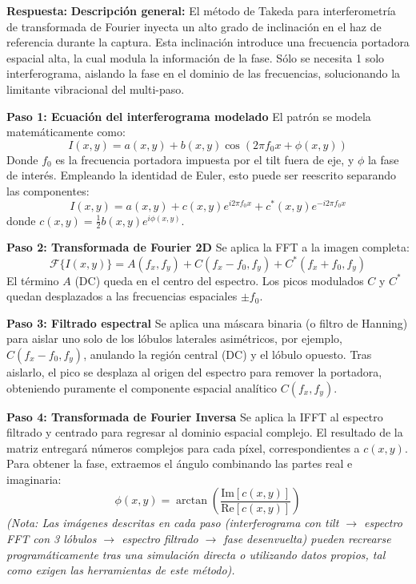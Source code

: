 \documentclass[12pt,letterpaper]{article}
\begin{document}
	\textbf{Respuesta:}
	\textbf{Descripción general:} El método de Takeda para interferometría de transformada de Fourier inyecta un alto grado de inclinación en el haz de referencia durante la captura. Esta inclinación introduce una frecuencia portadora espacial alta, la cual modula la información de la fase. Sólo se necesita 1 solo interferograma, aislando la fase en el dominio de las frecuencias, solucionando la limitante vibracional del multi-paso.
	
	\textbf{Paso 1: Ecuación del interferograma modelado}
	El patrón se modela matemáticamente como:
	\[
	I(x,y) = a(x,y) + b(x,y)\cos(2\pi f_0 x + \phi(x,y))
	\]
	Donde $f_0$ es la frecuencia portadora impuesta por el tilt fuera de eje, y $\phi$ la fase de interés. Empleando la identidad de Euler, esto puede ser reescrito separando las componentes:
	\[
	I(x,y) = a(x,y) + c(x,y)e^{i2\pi f_0 x} + c^*(x,y)e^{-i2\pi f_0 x}
	\]
	donde $c(x,y) = \frac{1}{2}b(x,y)e^{i\phi(x,y)}$.
	
	\textbf{Paso 2: Transformada de Fourier 2D}
	Se aplica la FFT a la imagen completa:
	\[
	\mathcal{F}\{I(x,y)\} = A(f_x, f_y) + C(f_x - f_0, f_y) + C^*(f_x + f_0, f_y)
	\]
	El término $A$ (DC) queda en el centro del espectro. Los picos modulados $C$ y $C^*$ quedan desplazados a las frecuencias espaciales $\pm f_0$.
	
	\textbf{Paso 3: Filtrado espectral}
	Se aplica una máscara binaria (o filtro de Hanning) para aislar uno solo de los lóbulos laterales asimétricos, por ejemplo, $C(f_x - f_0, f_y)$, anulando la región central (DC) y el lóbulo opuesto. Tras aislarlo, el pico se desplaza al origen del espectro para remover la portadora, obteniendo puramente el componente espacial analítico $C(f_x, f_y)$.
	
	\textbf{Paso 4: Transformada de Fourier Inversa}
	Se aplica la IFFT al espectro filtrado y centrado para regresar al dominio espacial complejo. El resultado de la matriz entregará números complejos para cada píxel, correspondientes a $c(x,y)$.
	Para obtener la fase, extraemos el ángulo combinando las partes real e imaginaria:
	\[
	\phi(x,y) = \arctan\left(\frac{\text{Im}[c(x,y)]}{\text{Re}[c(x,y)]}\right)
	\]
	\textit{(Nota: Las imágenes descritas en cada paso (interferograma con tilt $\rightarrow$ espectro FFT con 3 lóbulos $\rightarrow$ espectro filtrado $\rightarrow$ fase desenvuelta) pueden recrearse programáticamente tras una simulación directa o utilizando datos propios, tal como exigen las herramientas de este método).}
	
	\newpage
\end{document}
